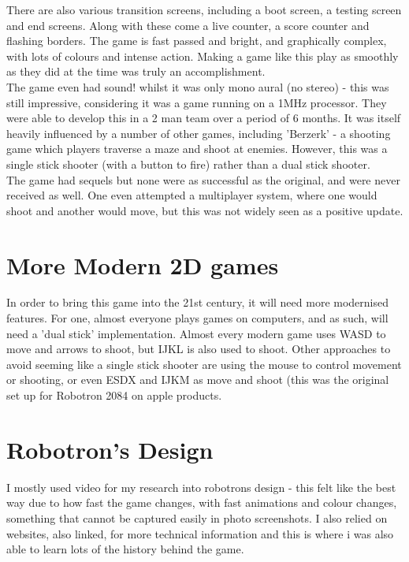 There are also various transition screens, including a boot screen, a testing screen and end screens. Along with these come a live counter, a score counter and flashing borders. The game is fast passed and bright, and graphically complex, with lots of colours and intense action. Making a game like this play as smoothly as they did at the time was truly an accomplishment.\\

The game even had sound! whilst it was only mono aural (no stereo) - this was still impressive, considering it was a game running on a 1MHz processor. They were able to develop this in a 2 man team over a period of 6 months. It was itself heavily influenced by a number of other games, including 'Berzerk' - a shooting game which players traverse a maze and shoot at enemies. However, this was a single stick shooter (with a button to fire) rather than a dual stick shooter.\\

The game had sequels but none were as successful as the original, and were never received as well. One even attempted a multiplayer system, where one would shoot and another would move, but this was not widely seen as a positive update.

\section{More Modern 2D games}
In order to bring this game into the 21st century, it will need more modernised features. For one, almost everyone plays games on computers, and as such, will need a 'dual stick' implementation. Almost every modern game uses WASD to move and arrows to shoot, but IJKL is also used to shoot. Other approaches to avoid seeming like a single stick shooter are using the mouse to control movement or shooting, or even ESDX and IJKM as move and shoot (this was the original set up for Robotron 2084 on apple products. 

\section{Robotron's Design}
I mostly used video for my research into robotrons design - this felt like the best way due to how fast the game changes, with fast animations and colour changes, something that cannot be captured easily in photo screenshots. I also relied on websites, also linked, for more technical information and this is where i was also able to learn lots of the history behind the game.


